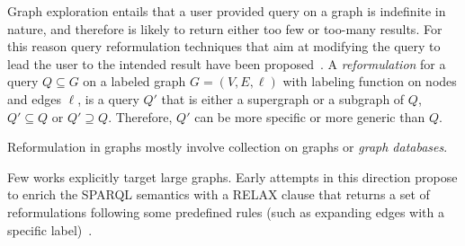 



Graph exploration entails that a user provided query on a graph is indefinite in nature, and therefore is likely to return either too few or too-many results. 
For this reason query reformulation techniques that aim at modifying the query to lead the user to the intended result have been proposed~\citep{mottin2015graph,hurtado2008query}. 
A \emph{reformulation} for a query $Q \subseteq G$ on a labeled graph $G = (V, E, \ell)$ with labeling function on nodes and edges $\ell$, is a query $Q'$ that is either a supergraph or a subgraph of $Q$, $Q' \subseteq Q$ or $Q' \supseteq Q$. 
Therefore, $Q'$ can be more specific or more generic than $Q$. 

Reformulation in graphs mostly involve collection on graphs or \emph{graph databases}.



Few works explicitly target large graphs.
Early attempts in this direction propose to enrich the SPARQL semantics with a \textsc{RELAX} clause that returns a set of reformulations following some predefined rules (such as expanding edges with a specific label)~\citep{hurtado2008query}.





